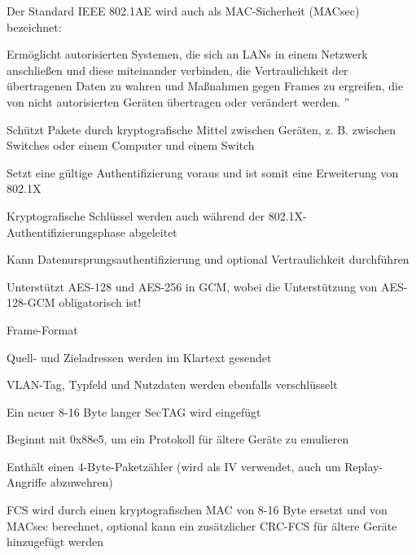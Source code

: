 \documentclass[a4paper]{article}
\begin{document}
\begin{multicols}{3}
      \begin{itemize*}
            \item Der Standard IEEE 802.1AE wird auch als MAC-Sicherheit (MACsec)
            bezeichnet:
            \begin{itemize*}
                  \item Ermöglicht autorisierten Systemen, die sich an LANs in einem Netzwerk anschließen und diese miteinander verbinden, die Vertraulichkeit der übertragenen Daten zu wahren und Maßnahmen gegen Frames zu ergreifen, die von nicht autorisierten Geräten übertragen oder verändert werden. ''
                  \item Schützt Pakete durch kryptografische Mittel zwischen Geräten, z. B. zwischen Switches oder einem Computer und einem Switch
                  \item Setzt eine gültige Authentifizierung voraus und ist somit eine Erweiterung von 802.1X
                  \item Kryptografische Schlüssel werden auch während der 802.1X-Authentifizierungsphase abgeleitet
                  \item Kann Datenursprungsauthentifizierung und optional Vertraulichkeit durchführen
                  \item Unterstützt AES-128 und AES-256 in GCM, wobei die Unterstützung von AES-128-GCM obligatorisch ist!
            \end{itemize*}
      \end{itemize*}

      Frame-Format

      \begin{itemize*}
            \item Quell- und Zieladressen werden im Klartext gesendet
            \item VLAN-Tag, Typfeld und Nutzdaten werden ebenfalls verschlüsselt
            \item Ein neuer 8-16 Byte langer SecTAG wird eingefügt
            \begin{itemize*}
                  \item Beginnt mit 0x88e5, um ein Protokoll für ältere Geräte zu emulieren
                  \item Enthält einen 4-Byte-Paketzähler (wird als IV verwendet, auch um Replay-Angriffe abzuwehren)
            \end{itemize*}
            \item FCS wird durch einen kryptografischen MAC von 8-16 Byte ersetzt und
            von MACsec berechnet, optional kann ein zusätzlicher CRC-FCS für
            ältere Geräte hinzugefügt werden
      \end{itemize*}


\end{multicols}
\end{document}
